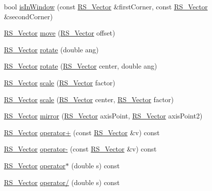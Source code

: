 \begin{DoxyCompactItemize}
\item 
bool \hyperlink{class_r_s___vector_a6c19c2c78a111944e2535adcae75136d}{is\-In\-Window} (const \hyperlink{class_r_s___vector}{R\-S\-\_\-\-Vector} \&first\-Corner, const \hyperlink{class_r_s___vector}{R\-S\-\_\-\-Vector} \&second\-Corner)
\item 
\hyperlink{class_r_s___vector}{R\-S\-\_\-\-Vector} \hyperlink{class_r_s___vector_a3a360bebed12fa83c947c44966c9fe84}{move} (\hyperlink{class_r_s___vector}{R\-S\-\_\-\-Vector} offset)
\item 
\hyperlink{class_r_s___vector}{R\-S\-\_\-\-Vector} \hyperlink{class_r_s___vector_abc4bb36b125f4ce256d2deb64111671c}{rotate} (double ang)
\item 
\hyperlink{class_r_s___vector}{R\-S\-\_\-\-Vector} \hyperlink{class_r_s___vector_a973518035d018fed0158ead562353fe9}{rotate} (\hyperlink{class_r_s___vector}{R\-S\-\_\-\-Vector} center, double ang)
\item 
\hyperlink{class_r_s___vector}{R\-S\-\_\-\-Vector} \hyperlink{class_r_s___vector_abc5d8ce9a4c95c8344d0ea050d674554}{scale} (\hyperlink{class_r_s___vector}{R\-S\-\_\-\-Vector} factor)
\item 
\hyperlink{class_r_s___vector}{R\-S\-\_\-\-Vector} \hyperlink{class_r_s___vector_a6dbe57df6193853149e87b7d9d284ac3}{scale} (\hyperlink{class_r_s___vector}{R\-S\-\_\-\-Vector} center, \hyperlink{class_r_s___vector}{R\-S\-\_\-\-Vector} factor)
\item 
\hyperlink{class_r_s___vector}{R\-S\-\_\-\-Vector} \hyperlink{class_r_s___vector_a9a4c0805bfd0b5832cb39b194f94fcc1}{mirror} (\hyperlink{class_r_s___vector}{R\-S\-\_\-\-Vector} axis\-Point, \hyperlink{class_r_s___vector}{R\-S\-\_\-\-Vector} axis\-Point2)
\item 
\hyperlink{class_r_s___vector}{R\-S\-\_\-\-Vector} \hyperlink{class_r_s___vector_a91c68dba1205738490da545d3a425b05}{operator+} (const \hyperlink{class_r_s___vector}{R\-S\-\_\-\-Vector} \&v) const 
\item 
\hyperlink{class_r_s___vector}{R\-S\-\_\-\-Vector} \hyperlink{class_r_s___vector_a18563367cac322844e732916b7bae69a}{operator-\/} (const \hyperlink{class_r_s___vector}{R\-S\-\_\-\-Vector} \&v) const 
\item 
\hyperlink{class_r_s___vector}{R\-S\-\_\-\-Vector} \hyperlink{class_r_s___vector_a38fa35a11fde7d3264c99921d4098894}{operator$\ast$} (double s) const 
\item 
\hyperlink{class_r_s___vector}{R\-S\-\_\-\-Vector} \hyperlink{class_r_s___vector_ac7bf961daf12d9401ac8a666ebb1497e}{operator/} (double s) const 

\end{DoxyCompactItemize}
